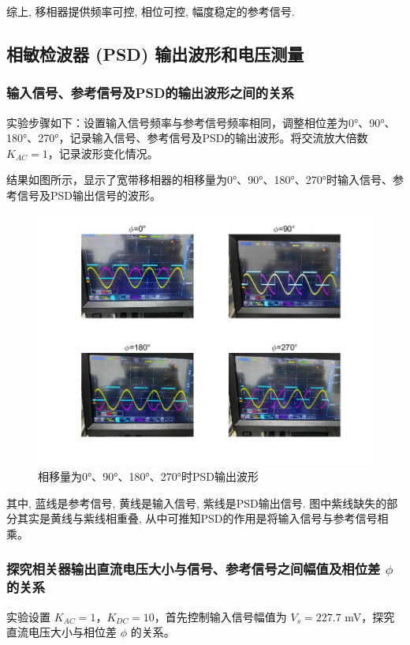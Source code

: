 \documentclass[12pt,a4paper]{article}
\begin{document}
综上, 移相器提供频率可控, 相位可控, 幅度稳定的参考信号.
\subsection{相敏检波器 (PSD) 输出波形和电压测量}

\subsubsection{输入信号、参考信号及PSD的输出波形之间的关系}

实验步骤如下：设置输入信号频率与参考信号频率相同，调整相位差为0°、90°、180°、270°，记录输入信号、参考信号及PSD的输出波形。将交流放大倍数 $K_{AC}=1$，记录波形变化情况。

结果如图所示，显示了宽带移相器的相移量为0°、90°、180°、270°时输入信号、参考信号及PSD输出信号的波形。
\begin{figure}[h]
    \centering
    \includegraphics[width=\textwidth]{参考信号相位拼图.jpg}
    \caption{相移量为0°、90°、180°、270°时PSD输出波形}
    \label{fig:reference-signal-phase}
    \end{figure}
其中, 蓝线是参考信号, 黄线是输入信号, 紫线是PSD输出信号. 图中紫线缺失的部分其实是黄线与紫线相重叠, 从中可推知PSD的作用是将输入信号与参考信号相乘。

\subsubsection{探究相关器输出直流电压大小与信号、参考信号之间幅值及相位差 $\phi$ 的关系}

实验设置 $K_{AC}=1$，$K_{DC}=10$，首先控制输入信号幅值为 $V_s=227.7$ mV，探究直流电压大小与相位差 $\phi$ 的关系。
\end{document}
